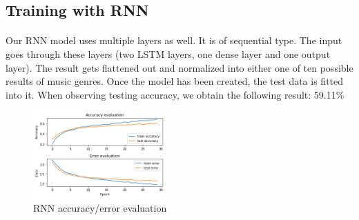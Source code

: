         \subsection{Training with RNN}
            \paragraph{}
            Our RNN model uses multiple layers as well. It is of sequential type. The input goes through these layers (two LSTM layers, one dense layer and one output layer). The result gets flattened out and normalized into either one of ten possible results of music genres. Once the model has been created, the test data is fitted into it. When observing testing accuracy, we obtain the following result: 59.11\%
            
        \begin{figure}[H]
            \centering
            \includegraphics[width=0.45\textwidth]{images/rnn_keras.png} 
            \caption{RNN accuracy/error evaluation}
        \end{figure}